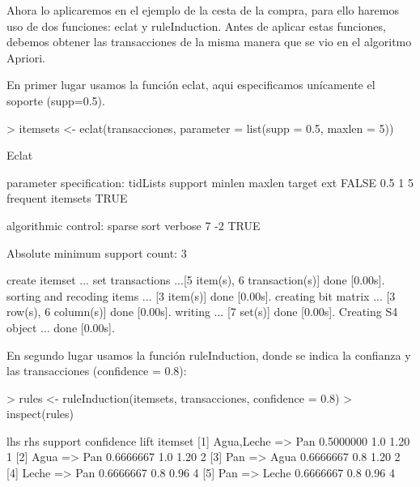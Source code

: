 \documentclass [a4paper] {article}
\begin{document}
Ahora lo aplicaremos en el ejemplo de la cesta de la compra, para ello haremos uso de dos funciones: eclat y ruleInduction. Antes de aplicar estas funciones, debemos obtener las transacciones de la misma manera que se vio en el algoritmo Apriori.

En primer lugar usamos la función eclat, aqui especificamos unícamente el soporte (supp=0.5).
\begin{Schunk}
\begin{Sinput}
> itemsets <- eclat(transacciones, parameter = list(supp = 0.5, maxlen = 5))
\end{Sinput}
\begin{Soutput}
Eclat

parameter specification:
 tidLists support minlen maxlen            target  ext
    FALSE     0.5      1      5 frequent itemsets TRUE

algorithmic control:
 sparse sort verbose
      7   -2    TRUE

Absolute minimum support count: 3 

create itemset ... 
set transactions ...[5 item(s), 6 transaction(s)] done [0.00s].
sorting and recoding items ... [3 item(s)] done [0.00s].
creating bit matrix ... [3 row(s), 6 column(s)] done [0.00s].
writing  ... [7 set(s)] done [0.00s].
Creating S4 object  ... done [0.00s].
\end{Soutput}
\end{Schunk}

En segundo lugar usamos la función ruleInduction, donde se indica la confianza
y las transacciones (confidence = 0.8):
\begin{Schunk}
\begin{Sinput}
> rules <- ruleInduction(itemsets, transacciones, confidence = 0.8)
> inspect(rules)
\end{Sinput}
\begin{Soutput}
    lhs             rhs     support   confidence lift itemset
[1] {Agua,Leche} => {Pan}   0.5000000 1.0        1.20 1      
[2] {Agua}       => {Pan}   0.6666667 1.0        1.20 2      
[3] {Pan}        => {Agua}  0.6666667 0.8        1.20 2      
[4] {Leche}      => {Pan}   0.6666667 0.8        0.96 4      
[5] {Pan}        => {Leche} 0.6666667 0.8        0.96 4      
\end{Soutput}
\end{Schunk}

\newpage
\end{document}
